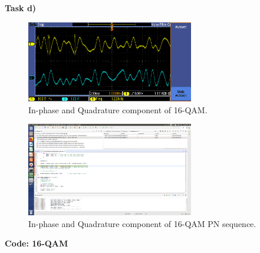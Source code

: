\documentclass{article}
\begin{document}
\pagebreak
\textbf{Task d)}

\begin{figure}[h]
  \begin{center}
    \includegraphics[width=0.65\textwidth]{img/task_d_oscilloscope.png}
    \caption{In-phase and Quadrature component of 16-QAM.}
  \end{center}
\end{figure}

\begin{figure}[h]
  \begin{center}
    \includegraphics[width=0.65\textwidth]{img/task_d_profile.png}
    \caption{In-phase and Quadrature component of 16-QAM PN sequence.}
  \end{center}
\end{figure}

\pagebreak
\textbf{Code: 16-QAM}
\end{document}
